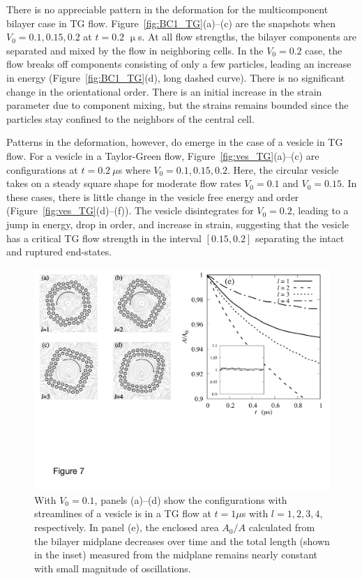 \documentclass[prb,preprint,showpacs,preprintnumbers,amsmath,amssymb,longbibliography]{revtex4-1}
\begin{document}
There is no appreciable pattern in the deformation for the
multicomponent bilayer case in TG flow. Figure~\ref{fig:BC1_TG}(a)--(c)
are the snapshots when $V_0=0.1,0.15,0.2$ at $t = 0.2$ $\upmu$s. At all
flow strengths, the bilayer components are separated and mixed by the
flow in neighboring cells. In the $V_0 = 0.2$ case, the flow breaks off
components consisting of only a few particles, leading an increase in
energy (Figure~\ref{fig:BC1_TG}(d), long dashed curve). There is no
significant change in the orientational order. There is an initial
increase in the strain parameter due to component mixing, but the
strains remains bounded since the particles stay confined to the
neighbors of the central cell.


Patterns in the deformation, however, do emerge in the case of a vesicle
in TG flow. For a vesicle in a Taylor-Green flow,
Figure~\ref{fig:ves_TG}(a)--(c) are configurations at $t=0.2\ \mu$s
where $V_0=0.1,0.15,0.2$. Here, the circular vesicle takes on a steady
square shape for moderate flow rates $V_0 = 0.1$ and $V_0 = 0.15$. In
these cases, there is little change in the vesicle free energy and order
(Figure~\ref{fig:ves_TG}(d)--(f)). The vesicle disintegrates for $V_0 =
0.2$, leading to a jump in energy, drop in order, and increase in
strain, suggesting that the vesicle has a critical TG flow strength in
the interval $[0.15, 0.2]$ separating the intact and ruptured
end-states.

\begin{figure}
  \begin{center}
\includegraphics[width=1.0\textwidth]{Figures/Figure7.pdf}
  \end{center}
  \vspace{-20pt}  
  \caption{\label{fig:BTG_Scale} With $V_0=0.1$, panels (a)--(d) show
  the configurations with streamlines of a vesicle is in a TG flow at
  $t=1 \mu$s with $l= 1,2,3,4$, respectively. In panel (e), the enclosed
  area $A_0/A$ calculated from the bilayer midplane decreases over time
  and the total length (shown in the inset) measured from the midplane
  remains nearly constant with small magnitude of oscillations.}
\end{figure}
\end{document}
